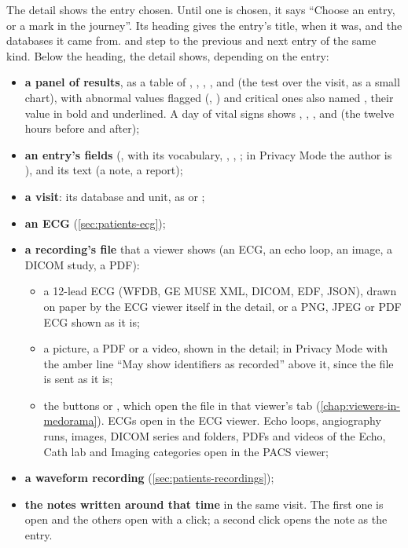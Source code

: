 The detail shows the entry chosen. Until one is chosen, it says ``Choose an entry, or a mark in
the journey''. Its heading gives the entry's title, when it was, and the databases it came
from. \ui{$\langle$} and \ui{$\rangle$} step to the previous and next entry of the same kind.
Below the heading, the detail shows, depending on the entry:
\begin{itemize}
\item \textbf{a panel of results}, as a table of , , ,
  ,  and  (the test over the visit, as a small chart),
  with abnormal values flagged (, ) and critical ones also named
  , their value in bold and underlined. A day of vital signs shows ,
  , ,  and  (the twelve hours before and after);
\item \textbf{an entry's fields} (,  with its vocabulary, ,
  , ; in Privacy Mode the author is ), and its text (a
  note, a report);
\item \textbf{a visit}: its database and unit, as  or ;
\item \textbf{an ECG} (\cref{sec:patients-ecg});
\item \textbf{a recording's file} that a viewer shows (an ECG, an echo loop, an image, a DICOM
  study, a PDF):
  \begin{itemize}
  \item a 12-lead ECG (WFDB, GE MUSE XML, DICOM, EDF, JSON), drawn on paper by the ECG viewer
    itself in the detail, or a PNG, JPEG or PDF ECG shown as it is;
  \item a picture, a PDF or a video, shown in the detail; in Privacy Mode with the amber line
    ``May show identifiers as recorded'' above it, since the file is sent as it is;
  \item the buttons  or , which open the file in that viewer's
    tab (\cref{chap:viewers-in-medorama}). ECGs open in the ECG viewer. Echo loops, angiography
    runs, images, DICOM series and folders, PDFs and videos of the Echo, Cath lab and Imaging
    categories open in the PACS viewer;
  \end{itemize}
\item \textbf{a waveform recording} (\cref{sec:patients-recordings});
\item \textbf{the notes written around that time} in the same visit. The first one is open and
  the others open with a click; a second click opens the note as the entry.
\end{itemize}

